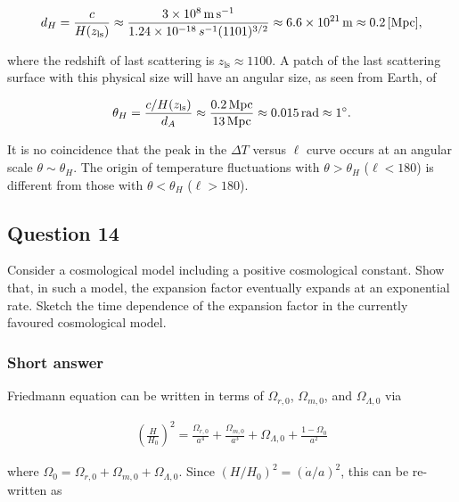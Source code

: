 \documentclass[a4paper,11pt]{article}
\begin{document}
\begin{align*}
    d_H = \frac{c}{H(z_\mathrm{ls})} \approx \frac{3\times10^8\,{\rm m\,s^{-1}}}{1.24\times10^{-18}\,s^{-1}(1101)^{3/2}} \approx 6.6\times10^{21}\,{\rm m} \approx 0.2\,{[\rm Mpc]},
\end{align*}

{\noindent}where the redshift of last scattering is $z_\mathrm{ls}\approx1100$. A patch of the last scattering surface with this physical size will have an angular size, as seen from Earth, of

\begin{align*}
    \theta_H = \frac{c/H(z_\mathrm{ls})}{d_A} \approx \frac{0.2\,{\rm Mpc}}{13\,{\rm Mpc}} \approx 0.015\,{\rm rad} \approx 1^\circ.
\end{align*}

{\noindent}It is no coincidence that the peak in the $\Delta T$ versus $\ell$ curve occurs at an angular scale $θ\sim\theta_H$. The origin of temperature fluctuations with $\theta>\theta_H$ ($\ell<180$) is different from those with $\theta<\theta_H$ ($\ell>180$).


%
%

\newpage
\subsection{Question 14}

Consider a cosmological model including a positive cosmological constant. Show that, in such a model, the expansion factor eventually expands at an exponential rate. Sketch the time dependence of the expansion factor in the currently favoured cosmological model.

\subsubsection{Short answer}

{\noindent}Friedmann equation can be written in terms of $\Omega_{r,0}$, $\Omega_{m,0}$, and $\Omega_{\Lambda,0}$ via

\begin{align*}
    \left(\frac{H}{H_0}\right)^2 = \frac{\Omega_{r,0}}{a^4} + \frac{\Omega_{m,0}}{a^3} + \Omega_{\Lambda,0} + \frac{1-\Omega_0}{a^2}
\end{align*}

{\noindent}where $\Omega_0=\Omega_{r,0}+\Omega_{m,0}+\Omega_{\Lambda,0}$. Since $(H/H_0)^2=(\dot{a}/a)^2$, this can be re-written as
\end{document}
